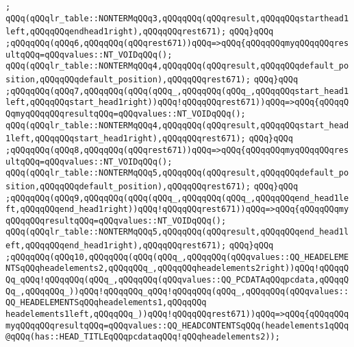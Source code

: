 \verb|;|\newline
\verb|qQQq(qQQqlr_table::NONTERMqQQq3,qQQqqQQq(qQQqresult,qQQqqQQqstarthead1left,qQQqqQQqendhead1right),qQQqqQQqrest671);|\newline
\verb|qQQq}qQQq|\newline
\verb|;qQQqqQQq(qQQq6,qQQqqQQq(qQQqrest671))qQQq=>qQQq{qQQqqQQqmyqQQqqQQqresultqQQq=qQQqvalues::NT_VOIDqQQq();|\newline
\verb|qQQq(qQQqlr_table::NONTERMqQQq4,qQQqqQQq(qQQqresult,qQQqqQQqdefault_position,qQQqqQQqdefault_position),qQQqqQQqrest671);|\newline
\verb|qQQq}qQQq|\newline
\verb|;qQQqqQQq(qQQq7,qQQqqQQq(qQQq(qQQq_,qQQqqQQq(qQQq_,qQQqqQQqstart_head1left,qQQqqQQqstart_head1right))qQQq!qQQqqQQqrest671))qQQq=>qQQq{qQQqqQQqmyqQQqqQQqresultqQQq=qQQqvalues::NT_VOIDqQQq();|\newline
\verb|qQQq(qQQqlr_table::NONTERMqQQq4,qQQqqQQq(qQQqresult,qQQqqQQqstart_head1left,qQQqqQQqstart_head1right),qQQqqQQqrest671);|\newline
\verb|qQQq}qQQq|\newline
\verb|;qQQqqQQq(qQQq8,qQQqqQQq(qQQqrest671))qQQq=>qQQq{qQQqqQQqmyqQQqqQQqresultqQQq=qQQqvalues::NT_VOIDqQQq();|\newline
\verb|qQQq(qQQqlr_table::NONTERMqQQq5,qQQqqQQq(qQQqresult,qQQqqQQqdefault_position,qQQqqQQqdefault_position),qQQqqQQqrest671);|\newline
\verb|qQQq}qQQq|\newline
\verb|;qQQqqQQq(qQQq9,qQQqqQQq(qQQq(qQQq_,qQQqqQQq(qQQq_,qQQqqQQqend_head1left,qQQqqQQqend_head1right))qQQq!qQQqqQQqrest671))qQQq=>qQQq{qQQqqQQqmyqQQqqQQqresultqQQq=qQQqvalues::NT_VOIDqQQq();|\newline
\verb|qQQq(qQQqlr_table::NONTERMqQQq5,qQQqqQQq(qQQqresult,qQQqqQQqend_head1left,qQQqqQQqend_head1right),qQQqqQQqrest671);|\newline
\verb|qQQq}qQQq|\newline
\verb|;qQQqqQQq(qQQq10,qQQqqQQq(qQQq(qQQq_,qQQqqQQq(qQQqvalues::QQ_HEADELEMENTSqQQqheadelements2,qQQqqQQq_,qQQqqQQqheadelements2right))qQQq!qQQqqQQq_qQQq!qQQqqQQq(qQQq_,qQQqqQQq(qQQqvalues::QQ_PCDATAqQQqpcdata,qQQqqQQq_,qQQqqQQq_))qQQq!qQQqqQQq_qQQq!qQQqqQQq(qQQq_,qQQqqQQq(qQQqvalues::QQ_HEADELEMENTSqQQqheadelements1,qQQqqQQq|\newline
\verb|headelements1left,qQQqqQQq_))qQQq!qQQqqQQqrest671))qQQq=>qQQq{qQQqqQQqmyqQQqqQQqresultqQQq=qQQqvalues::QQ_HEADCONTENTSqQQq(headelements1qQQq@qQQq(has::HEAD_TITLEqQQqpcdataqQQq!qQQqheadelements2));|\newline
